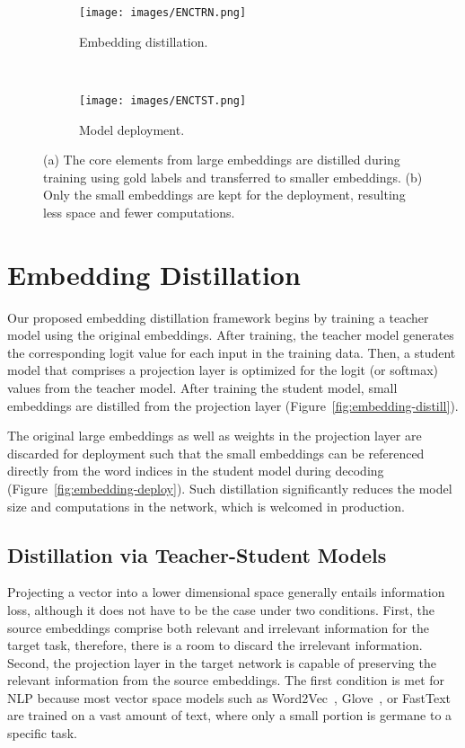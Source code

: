 \documentclass{article}
\begin{document}
\begin{figure}[ht!]
	\centering
	\begin{subfigure}[b]{0.23\textwidth}
		\centering
\texttt{[image: images/ENCTRN.png]}
		\caption{Embedding distillation.}
		\label{fig:embedding-encoding-distill}
	\end{subfigure}~ 
	\begin{subfigure}[b]{0.23\textwidth}
		\centering
\texttt{[image: images/ENCTST.png]}
		\caption{Model deployment.}
		\label{fig:embedding-encoding-deploy}
	\end{subfigure}\caption{(a) The core elements from large embeddings are distilled during training using gold labels and transferred to smaller embeddings. (b) Only the small embeddings are kept for the deployment, resulting less space and fewer computations.}
	\label{fig:embedding-encoding}
\end{figure} 

\section{Embedding Distillation}
\label{sec:distillation}


Our proposed embedding distillation framework begins by training a teacher model using the original embeddings.
After training, the teacher model generates the corresponding logit value for each input in the training data.
Then, a student model that comprises a projection layer is optimized for the logit (or softmax) values from the teacher model.
After training the student model, small embeddings are distilled from the projection layer (Figure~\ref{fig:embedding-distill}).

\noindent The original large embeddings as well as weights in the projection layer are discarded for deployment such that the small embeddings can be referenced directly from the word indices in the student model during decoding (Figure~\ref{fig:embedding-deploy}).
Such distillation significantly reduces the model size and computations in the network, which is welcomed in production.






\subsection{Distillation via Teacher-Student Models}
\label{ssec:distillation}

\noindent Projecting a vector into a lower dimensional space generally entails information loss, although it does not have to be the case under two conditions.
First, the source embeddings comprise both relevant and irrelevant information for the target task, therefore, there is a room to discard the irrelevant information.
Second, the projection layer in the target network is capable of preserving the relevant information from the source embeddings.
The first condition is met for NLP because most vector space models such as Word2Vec~\cite{mikolov2013distributed}, Glove~\cite{pennington-socher-manning:2014:EMNLP2014}, or FastText~\cite{Q17-1010} are trained on a vast amount of text, where only a small portion is germane to a specific task.
\end{document}
